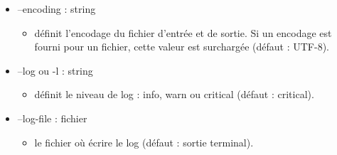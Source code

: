 \documentclass[manual-fr.tex]{subfiles}
\begin{document}
\begin{itemize}
\begin{itemize}
\begin{itemize}
                \end{itemize}
            \item[] --encoding : string
                \begin{itemize}
                    \item[] définit l'encodage du fichier d'entrée et de sortie. Si un encodage est fourni pour un fichier,
                        cette valeur est surchargée (défaut : UTF-8).
                \end{itemize}
            \item[] --log ou -l : string
                \begin{itemize}
                    \item[] définit le niveau de log : info, warn ou critical (défaut : critical).
                \end{itemize}
            \item[] --log-file : fichier
                \begin{itemize}
                    \item[] le fichier où écrire le log (défaut : sortie terminal).
                \end{itemize}
        \end{itemize}
\end{itemize}
\end{document}
